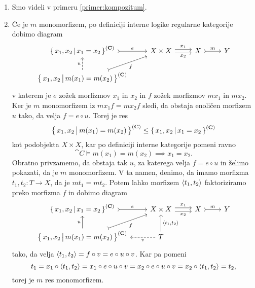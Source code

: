 \documentclass[../kategoricna_logika.tex]{subfiles}
\begin{document}
\begin{dokaz}
  \begin{enumerate}[label=(\roman*)]
  \item Smo videli v primeru \ref{primer:kompozitum}.

  \item Če je $m$ monomorfizem, po definiciji interne logike regularne
    kategorije dobimo diagram
    \begin{equation*}
      \begin{tikzcd}
        \setb{x_1,x_2}{x_1 = x_2}^{(\cat{C})} \ar[r, tail, "e"] & X \times X \ar[r, shift left, "x_1"] \ar[r, shift right, "x_2"'] & X \ar[r, tail, "m"] & Y \\
        \setb{x_1,x_2}{m(x_1) = m(x_2)}^{(\cat{C})} \ar[ur, tail,
        "f"'] \ar[u, dashed, "u"]
      \end{tikzcd}
    \end{equation*}
    v katerem je $e$ zožek morfizmov $x_1$ in $x_2$ in $f$ zožek
    morfizmov $m x_1$ in $m x_2$.  Ker je $m$ monomorfizem iz
    $m x_1 f = m x_2 f$ sledi, da obstaja enoličen morfizem $u$ tako,
    da velja $f = e \circ u$. Torej je res
      $$\left\lbrace\, x_1,x_2 \,\middle|\, m(x_1) = m(x_2) \,\right\rbrace^{({\operatorname{\mathbf{C}}})} \leq \left\lbrace\, x_1,x_2 \,\middle|\, x_1 = x_2 \,\right\rbrace^{({\operatorname{\mathbf{C}}})}$$
      kot podobjekta $X \times X$, kar po definiciji interne
      kategorije pomeni ravno
      \[\cat{C} \models m(x_1) = m(x_2) \implies x_1 = x_2.\]
      Obratno privzamemo, da obstaja tak $u$, za katerega velja
      $f = e \circ u$ in želimo pokazati, da je $m$ monomorfizem.  V
      ta namen, denimo, da imamo morfizma $t_1, t_2 : T \to X$, da je
      $m t_1 = m t_2$.  Potem lahko morfizem $\langle t_1, t_2 \rangle$
      faktoriziramo preko morfizma $f$ in dobimo diagram
      \begin{equation*}
        \begin{tikzcd}
          \setb{x_1,x_2}{x_1 = x_2}^{(\cat{C})} \ar[r, tail, "e"] & X \times X \ar[r, shift left, "x_1"] \ar[r, shift right, "x_2"'] & X \ar[r, tail, "m"] & Y \\
          \setb{x_1,x_2}{m(x_1) = m(x_2)}^{(\cat{C})} \ar[ur, tail,
          "f"'] \ar[u, "u"] & T \ar[u, "\fprod{t_1, t_2}"'] \ar[l,
          dashed, "v"]
        \end{tikzcd}
      \end{equation*}
      tako, da velja
      $\langle t_1, t_2 \rangle = f \circ v = e \circ u \circ v$. Kar pa
      pomeni
      $$t_1 = x_1 \circ \langle t_1, t_2 \rangle = x_1 \circ e \circ u \circ v = x_2 \circ e \circ u \circ v = x_2 \circ \langle t_1, t_2 \rangle = t_2,$$
      torej je $m$ res monomorfizem.


\end{enumerate}
\end{dokaz}
\end{document}
